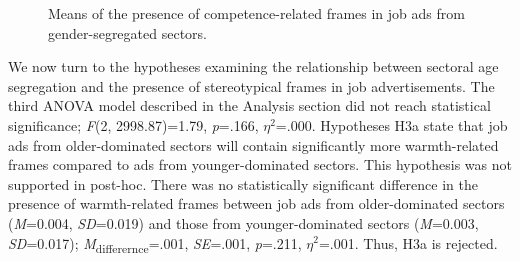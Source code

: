 \documentclass[jou]{apa7}
\begin{document}
\begin{figure*}
    \caption{Means of the presence of competence-related frames in job ads from gender-segregated sectors.}
    \label{figure2}
    \end{figure*}

We now turn to the hypotheses examining the relationship between sectoral age segregation and the presence of stereotypical frames in job advertisements. The third ANOVA model described in the Analysis section did not reach statistical significance; \textit{F}(2, 2998.87)=1.79, \textit{p}=.166, \textit{$\eta^2$}=.000. Hypotheses H3a state that job ads from older-dominated sectors will contain significantly more warmth-related frames compared to ads from younger-dominated sectors. This hypothesis was not supported in post-hoc. There was no statistically significant difference in the presence of warmth-related frames between job ads from older-dominated sectors (\textit{M}=0.004, \textit{SD}=0.019) and those from younger-dominated sectors (\textit{M}=0.003, \textit{SD}=0.017); \textit{M}\textsubscript{differernce}=.001, \textit{SE}=.001, \textit{p}=.211, \textit{$\eta^2$}=.001. Thus, H3a is rejected.
\end{document}
